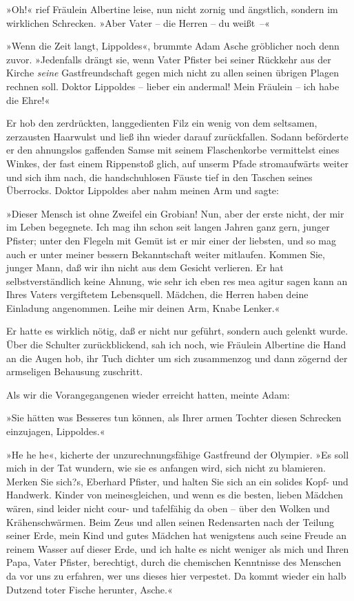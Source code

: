 »Oh!« rief Fräulein Albertine leise, nun nicht zornig und
ängstlich, sondern im wirklichen Schrecken. »Aber Vater – die
Herren – du weißt~–«

»Wenn die Zeit langt, Lippoldes«, brummte Adam Asche gröblicher
noch denn zuvor. »Jedenfalls drängt sie, wenn Vater Pfister bei
seiner Rückkehr aus der Kirche \emph{seine} Gastfreundschaft gegen
mich nicht zu allen seinen übrigen Plagen rechnen soll. Doktor
Lippoldes – lieber ein andermal! Mein Fräulein – ich habe die
Ehre!«

Er hob den zerdrückten, langgedienten Filz ein wenig von dem
seltsamen, zerzausten Haarwulst und ließ ihn wieder darauf
zurückfallen. Sodann beförderte er den ahnungslos gaffenden Samse
mit seinem Flaschenkorbe vermittelst eines Winkes, der fast einem
Rippenstoß glich, auf unserm Pfade stromaufwärts weiter und sich
ihm nach, die handschuhlosen Fäuste tief in den Taschen seines
Überrocks. Doktor Lippoldes aber nahm meinen Arm und sagte:

»Dieser Mensch ist ohne Zweifel ein Grobian! Nun, aber der erste
nicht, der mir im Leben begegnete. Ich mag ihn schon seit langen
Jahren ganz gern, junger Pfister; unter den Flegeln mit Gemüt ist
er mir einer der liebsten, und so mag auch er unter meiner bessern
Bekanntschaft weiter mitlaufen. Kommen Sie, junger Mann, daß wir
ihn nicht aus dem Gesicht verlieren. Er hat selbstverständlich
keine Ahnung, wie sehr ich eben res mea agitur sagen kann an Ihres
Vaters vergiftetem Lebensquell. Mädchen, die Herren haben deine
Einladung angenommen. Leihe mir deinen Arm, Knabe Lenker.«

Er hatte es wirklich nötig, daß er nicht nur geführt, sondern auch
gelenkt wurde. Über die Schulter zurückblickend, sah ich noch, wie
Fräulein Albertine die Hand an die Augen hob, ihr Tuch dichter um
sich zusammenzog und dann zögernd der armseligen Behausung
zuschritt.

Als wir die Vorangegangenen wieder erreicht hatten, meinte Adam:

»Sie hätten was Besseres tun können, als Ihrer armen Tochter diesen
Schrecken einzujagen, Lippoldes.«

»He he he«, kicherte der unzurechnungsfähige Gastfreund der
Olympier. »Es soll mich in der Tat wundern, wie sie es anfangen
wird, sich nicht zu blamieren. Merken Sie sich?s, Eberhard Pfister,
und halten Sie sich an ein solides Kopf- und Handwerk. Kinder von
meinesgleichen, und wenn es die besten, lieben Mädchen wären, sind
leider nicht cour- und tafelfähig da oben – über den Wolken und
Krähenschwärmen. Beim Zeus und allen seinen Redensarten nach der
Teilung seiner Erde, mein Kind und gutes Mädchen hat wenigstens
auch seine Freude an reinem Wasser auf dieser Erde, und ich halte
es nicht weniger als mich und Ihren Papa, Vater Pfister,
berechtigt, durch die chemischen Kenntnisse des Menschen da vor uns
zu erfahren, wer uns dieses hier verpestet. Da kommt wieder ein
halb Dutzend toter Fische herunter, Asche.«

